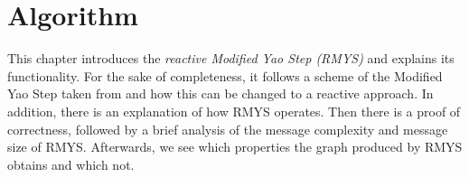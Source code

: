 %
%
\section{Algorithm}
This chapter introduces the \emph{reactive Modified Yao Step (RMYS)} and explains its functionality.
For the sake of completeness, it follows a scheme of the Modified Yao Step taken from \cite{kanj} and how this can be changed to a reactive approach.
In addition, there is an explanation of how RMYS operates.
Then there is a proof of correctness, followed by a brief analysis of the message complexity and message size of RMYS.
Afterwards, we see which properties the graph produced by RMYS obtains and which not.


